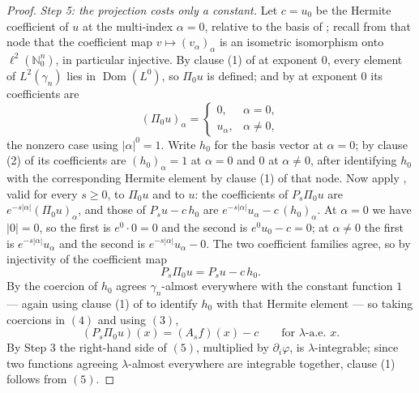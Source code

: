 \begin{proof}
\emph{Step 5: the projection costs only a constant.}
Let $c = u_0$ be the Hermite coefficient of $u$ at the multi-index $\alpha = 0$,
relative to the basis of ; recall from that node that the
coefficient map $v \mapsto (v_\alpha)_\alpha$ is an isometric isomorphism onto
$\ell^2(\mathbb{N}_0^n)$, in particular injective.  By clause (1) of
 at exponent $0$, every element of $L^2(\gamma_n)$ lies in
$\operatorname{Dom}(L^0)$, so $\Pi_0u$ is defined; and by  at
exponent $0$ its coefficients are
\[
  (\Pi_0u)_\alpha = \begin{cases} 0, & \alpha = 0,\\ u_\alpha, & \alpha \neq 0,\end{cases}
\]
the nonzero case using $|\alpha|^0 = 1$.  Write $h_0$ for the basis vector at
$\alpha = 0$; by clause (2) of  its coefficients
are $(h_0)_\alpha = 1$ at $\alpha = 0$ and $0$ at $\alpha \neq 0$, after
identifying $h_0$ with the corresponding Hermite element by clause (1) of that
node.  Now apply , valid for every $s \geq 0$, to
$\Pi_0u$ and to $u$: the coefficients of $P_s\Pi_0u$ are
$e^{-s|\alpha|}(\Pi_0u)_\alpha$, and those of $P_su - c\,h_0$ are
$e^{-s|\alpha|}u_\alpha - c\,(h_0)_\alpha$.  At $\alpha = 0$ we have $|0| = 0$,
so the first is $e^{0}\cdot 0 = 0$ and the second is $e^{0}u_0 - c = 0$; at
$\alpha \neq 0$ the first is $e^{-s|\alpha|}u_\alpha$ and the second is
$e^{-s|\alpha|}u_\alpha - 0$.  The two coefficient families agree, so by
injectivity of the coefficient map
\begin{equation*}
  P_s\Pi_0u = P_su - c\,h_0 . \tag{4}
\end{equation*}
By  the coercion of $h_0$ agrees $\gamma_n$-almost
everywhere with the constant function $1$ --- again using clause (1) of
 to identify $h_0$ with that Hermite element ---
so taking coercions in $(4)$ and using $(3)$,
\begin{equation*}
  (P_s\Pi_0u)(x) = (A_sf)(x) - c
  \qquad\text{for } \lambda\text{-a.e. } x. \tag{5}
\end{equation*}
By Step 3 the right-hand side of $(5)$, multiplied by $\partial_i\varphi$, is
$\lambda$-integrable; since two functions agreeing $\lambda$-almost everywhere
are integrable together, clause (1) follows from $(5)$.


\end{proof}
